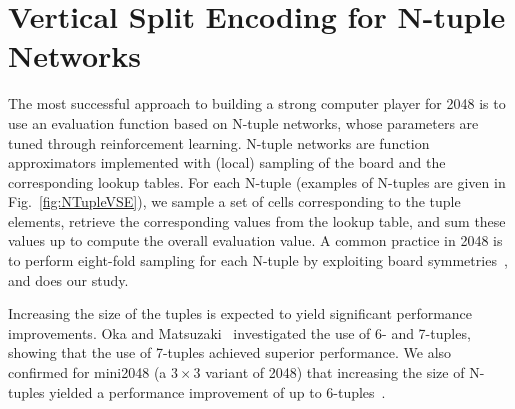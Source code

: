 \section{Vertical Split Encoding for N-tuple Networks}

The most successful approach to building a strong computer player for 2048 is to use an evaluation function based on N-tuple networks, whose parameters are tuned through reinforcement learning.
N-tuple networks are function approximators implemented with (local) sampling of the board and the corresponding lookup tables.
For each N-tuple (examples of N-tuples are given in Fig.~\ref{fig:NTupleVSE}), we sample a set of cells corresponding to the tuple elements, retrieve the corresponding values from the lookup table, and sum these values up to compute the overall evaluation value.
A common practice in 2048 is to perform eight-fold sampling for each N-tuple by exploiting board symmetries~\cite{SzJa14}, and does our study.

Increasing the size of the tuples is expected to yield significant performance improvements.
Oka and Matsuzaki~\cite{OkMa16} investigated the use of 6- and 7-tuples, showing that the use of 7-tuples achieved superior performance. We also confirmed for mini2048 (a $3\times 3$ variant of 2048) that increasing the size of N-tuples yielded a performance improvement of up to 6-tuples~\cite{TeMa25}.


